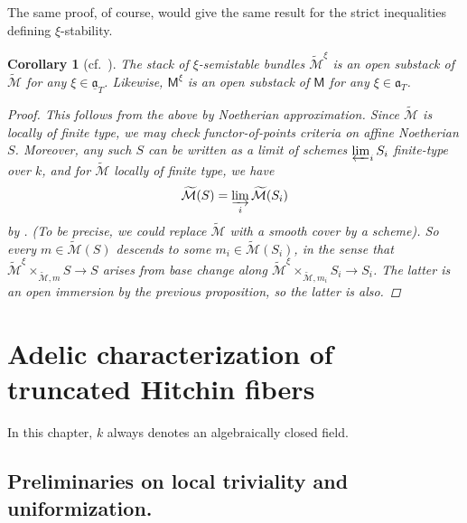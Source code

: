 \documentclass[openany]{amsbook}
\newtheorem{corollary}[theorem]{Corollary}
\theoremstyle{definition}
\theoremstyle{remark}
\numberwithin{equation}{section}
\newcommand{\cM}{\mathcal{M}}
\newcommand{\ul}[1]{\underline{#1}}
\renewcommand{\-}{\operatorname{-}}
\renewcommand{\a}{\mathfrak{a}}
\newcommand{\ctM}{\widetilde{\cM}}
\newcommand{\bM}{\mathsf{M}}
\newcommand{\ga}{\ul{\a}}
\begin{document}
The same proof, of course, would give the same result for the strict inequalities defining $\xi$-stability.

\begin{corollary}[{{cf.\ \cite[Proposition 6.1.4]{CLI}}}]
    The stack of $\xi$-semistable bundles $\ctM^\xi$ is an open substack of $\ctM$ for any $\xi \in \ga_T$. Likewise, $\bM^\xi$ is an open substack of $\bM$ for any $\xi \in \a_T$.
    \begin{proof}
        This follows from the above by Noetherian approximation. Since $\ctM$ is locally of finite type, we may check functor-of-points criteria on affine Noetherian $S$. Moreover, any such $S$ can be written as a limit of schemes $\varprojlim_i S_i$ finite-type over $k$, and for $\ctM$ locally of finite type, we have 
        $$
        \ctM(S) = \varinjlim_i \ctM(S_i)
        $$
        by \cite[Tag. 01ZC]{stacks-project}. (To be precise, we could replace $\ctM$ with a smooth cover by a scheme). So every $m \in \ctM(S)$ descends to some $m_i \in \ctM(S_i)$, in the sense that $\ctM^{\xi} \times_{\ctM, m} S \to S$ arises from base change along $\ctM^{\xi} \times_{\ctM, m_i} S_i \to S_i$. The latter is an open immersion by the previous proposition, so the latter is also. 
    \end{proof}
\end{corollary}






\chapter{Adelic characterization of truncated Hitchin fibers}\label{sect.adelic.fibers}

In this chapter, $k$ always denotes an algebraically closed field.

\section{Preliminaries on local triviality and uniformization.}\label{subsect.loc.triv}
\end{document}
